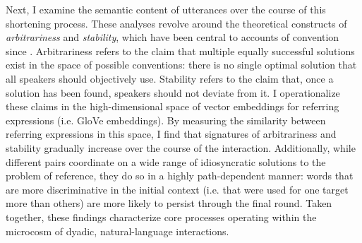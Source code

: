 \documentclass[11pt]{article}
\begin{document}
Next, I examine the semantic content of utterances over the course of this shortening process.
These analyses revolve around the theoretical constructs of \emph{arbitrariness} and \emph{stability}, which have been central to accounts of convention since .
Arbitrariness refers to the claim that multiple equally successful solutions exist in the space of possible conventions: there is no single optimal solution that all speakers should objectively use.
Stability refers to the claim that, once a solution has been found, speakers should not deviate from it.
I operationalize these claims in the high-dimensional space of vector embeddings for referring expressions (i.e. GloVe embeddings).
By measuring the similarity between referring expressions in this space, I find that signatures of arbitrariness and stability gradually increase over the course of the interaction.
Additionally, while different pairs coordinate on a wide range of idiosyncratic solutions to the problem of reference, they do so in a highly path-dependent manner: words that are more discriminative in the initial context (i.e. that were used for one target more than others) are more likely to persist through the final round.
Taken together, these findings characterize core processes operating within the microcosm of dyadic, natural-language interactions.


%
\end{document}
